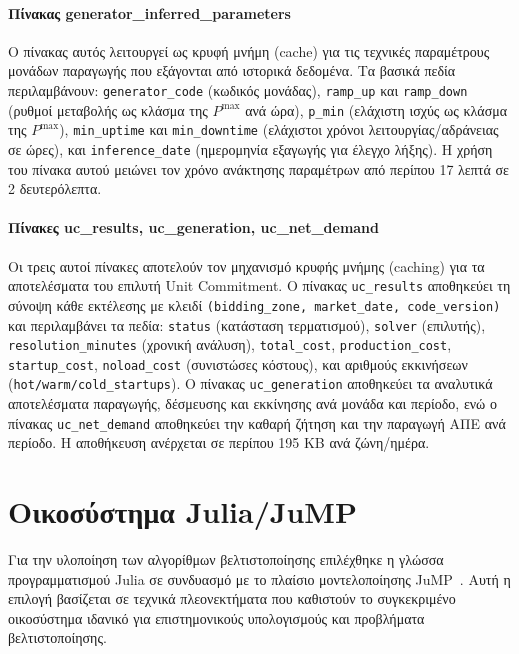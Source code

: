 \paragraph{Πίνακας generator\_inferred\_parameters}
Ο πίνακας αυτός λειτουργεί ως κρυφή μνήμη (cache) για τις τεχνικές παραμέτρους μονάδων παραγωγής που εξάγονται από ιστορικά δεδομένα. Τα βασικά πεδία περιλαμβάνουν: \texttt{generator\_code} (κωδικός μονάδας), \texttt{ramp\_up} και \texttt{ramp\_down} (ρυθμοί μεταβολής ως κλάσμα της $P^{\max}$ ανά ώρα), \texttt{p\_min} (ελάχιστη ισχύς ως κλάσμα της $P^{\max}$), \texttt{min\_uptime} και \texttt{min\_downtime} (ελάχιστοι χρόνοι λειτουργίας/αδράνειας σε ώρες), και \texttt{inference\_date} (ημερομηνία εξαγωγής για έλεγχο λήξης). Η χρήση του πίνακα αυτού μειώνει τον χρόνο ανάκτησης παραμέτρων από περίπου 17 λεπτά σε 2 δευτερόλεπτα.

\paragraph{Πίνακες uc\_results, uc\_generation, uc\_net\_demand}
Οι τρεις αυτοί πίνακες αποτελούν τον μηχανισμό κρυφής μνήμης (caching) για τα αποτελέσματα του επιλυτή Unit Commitment. Ο πίνακας \texttt{uc\_results} αποθηκεύει τη σύνοψη κάθε εκτέλεσης με κλειδί \texttt{(bidding\_zone, market\_date, code\_version)} και περιλαμβάνει τα πεδία: \texttt{status} (κατάσταση τερματισμού), \texttt{solver} (επιλυτής), \texttt{resolution\_minutes} (χρονική ανάλυση), \texttt{total\_cost}, \texttt{production\_cost}, \texttt{startup\_cost}, \texttt{noload\_cost} (συνιστώσες κόστους), και αριθμούς εκκινήσεων (\texttt{hot/warm/cold\_startups}). Ο πίνακας \texttt{uc\_generation} αποθηκεύει τα αναλυτικά αποτελέσματα παραγωγής, δέσμευσης και εκκίνησης ανά μονάδα και περίοδο, ενώ ο πίνακας \texttt{uc\_net\_demand} αποθηκεύει την καθαρή ζήτηση και την παραγωγή ΑΠΕ ανά περίοδο. Η αποθήκευση ανέρχεται σε περίπου 195 KB ανά ζώνη/ημέρα.


\section{Οικοσύστημα Julia/JuMP}
\label{sec:julia-jump}

Για την υλοποίηση των αλγορίθμων βελτιστοποίησης επιλέχθηκε η γλώσσα προγραμματισμού Julia σε συνδυασμό με το πλαίσιο μοντελοποίησης JuMP~\cite{bezanson2017, jump2017}. Αυτή η επιλογή βασίζεται σε τεχνικά πλεονεκτήματα που καθιστούν το συγκεκριμένο οικοσύστημα ιδανικό για επιστημονικούς υπολογισμούς και προβλήματα βελτιστοποίησης.


